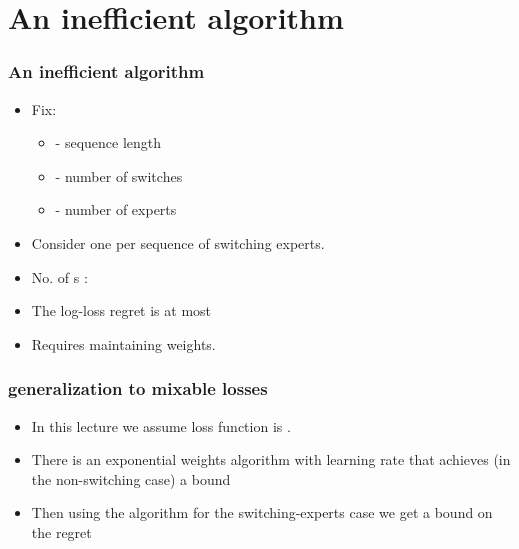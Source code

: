 \documentclass{beamer}
\begin{document}
\section{An inefficient algorithm}

\begin{frame}
\frametitle{An inefficient algorithm}
\begin{itemize}
\item Fix:
\begin{itemize}
\item {} - sequence length
\item {} - number of switches
\item {} - number of experts
\end{itemize}
\item Consider one  per sequence of switching experts.
\item No. of s : 
\item The log-loss regret is at most 
\item Requires maintaining  weights.
\end{itemize}
\end{frame}

\begin{frame}
\frametitle{generalization to mixable losses}
\begin{itemize}
\item In this lecture we assume loss function is .
\item There is an exponential weights algorithm with learning rate \R{$\eta$} that 
achieves (in the non-switching case) a bound 
\item Then using the  algorithm for the switching-experts case 
we get a bound on the regret 
\end{itemize}
\end{frame}
\end{document}
